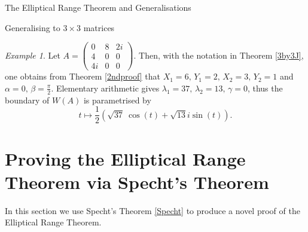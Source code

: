 \documentclass[12pt]{article}
\theoremstyle{plain}
\theoremstyle{definition}
\theoremstyle{remark}
\newtheorem{Lemma}[Theorem]{Lemma}
\newtheorem{Example}[Theorem]{Example}
\numberwithin{equation}{section}
\begin{document}
\begin{section}{The Elliptical Range Theorem and Generalisations}
\begin{subsection}{Generalising to $3 \times 3$ matrices}
\begin{Example}
    Let $A= \begin{pmatrix}
        0 & 8 & 2i \\
        4 & 0 & 0 \\
        4i & 0 & 0
    \end{pmatrix}$. Then, with the notation in Theorem \ref{3by3J}, one obtains from Theorem \ref{2ndproof} that $X_1=6, \, Y_1=2, \, X_2=3, \, Y_2=1$ and $\alpha =0 , \, \beta = \frac{\pi}{2}$. Elementary arithmetic gives $\lambda_1 = 37, \, \lambda_2 = 13, \, \gamma = 0$, thus the boundary of $W(A)$ is parametrised by
    $$
    t \mapsto \frac{1}{2}\left(\sqrt{37}\ \cos (t) + \sqrt{13}i \sin (t)\right).
    $$
\end{Example}
\end{subsection}
\end{section}









\section{Proving the Elliptical Range Theorem via Specht's Theorem}\label{2.3}
In this section we use Specht's Theorem \ref{Specht} to produce a novel proof of the Elliptical Range Theorem.




\end{document}
